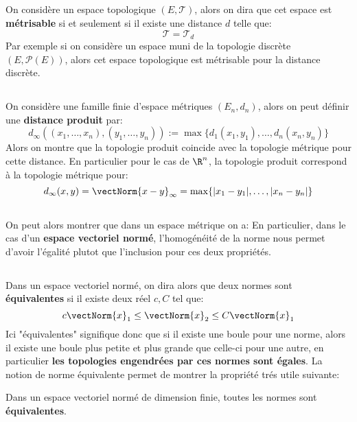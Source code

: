 \subsection*{}
On considère un espace topologique \((E, \mathcal{T})\), alors on dira que cet espace est \textbf{métrisable} si et seulement si il existe une distance \(d\) telle que:
\[
   \mathcal{T} = \mathcal{T}_d
\]
Par exemple si on considère un espace muni de la topologie discrète \((E, \mathcal{P}(E))\), alors cet espace topologique est métrisable pour la distance discrète.
\subsection*{}
On considère une famille finie d'espace métriques \((E_n, d_n)\), alors on peut définir une \textbf{distance produit} par:
\[
   d_\infty((x_1, \ldots, x_n), (y_1, \ldots, y_n)) := \max\{d_1(x_1, y_1), \ldots, d_n(x_n, y_n)\}
\]
Alors on montre que la topologie produit coincide avec la topologie métrique pour cette distance. En particulier pour le cas de \(\R^n\), la topologie produit correspond à la topologie métrique pour:
\[
   d_\infty(x, y) = \vectNorm{x - y}_\infty = \max\{|x_1 - y_1|, \ldots, |x_n - y_n|\}
\]
\subsection*{}
On peut alors montrer que dans un espace métrique on a:
En particulier, dans le cas d'un \textbf{espace vectoriel normé}, l'homogénéité de la norme nous permet d'avoir l'égalité plutot que l'inclusion pour ces deux propriétés. 
\subsection*{}
Dans un espace vectoriel normé, on dira alors que deux normes sont \textbf{équivalentes} si il existe deux réel \(c, C\) tel que:
\[
   c\vectNorm{x}_1 \leq \vectNorm{x}_2 \leq C\vectNorm{x}_1
\]
Ici "équivalentes" signifique donc que si il existe une boule pour une norme, alors il existe une boule plus petite et plus grande que celle-ci pour une autre, en particulier \textbf{les topologies engendrées par ces normes sont égales}.\+
La notion de norme équivalente permet de montrer la propriété trés utile suivante:
\begin{center}
   Dans un espace vectoriel normé de dimension finie, toutes les normes sont \textbf{équivalentes}.
\end{center}
